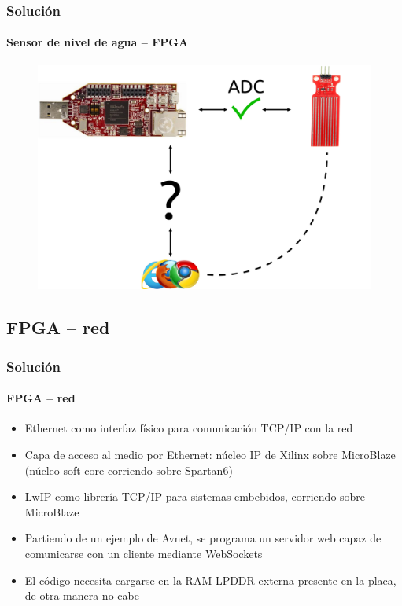 \documentclass[compress]{beamer}
\begin{document}
		\begin{frame}
			\frametitle{Soluci\'on}
			\framesubtitle{Sensor de nivel de agua -- FPGA}
				\begin{figure}
					\includegraphics[keepaspectratio = true, totalheight=0.6\textheight]{figuras/adc_ok.png}
				\end{figure}
 		\end{frame}

	\subsection{FPGA -- red}
		\begin{frame}
			\frametitle{Soluci\'on}
			\framesubtitle{FPGA -- red}
				\begin{itemize}
					\item
					{

						Ethernet como interfaz f\'isico para comunicaci\'on TCP/IP con la red

					}
					\item
					{

						Capa de acceso al medio por Ethernet: n\'ucleo IP de Xilinx sobre MicroBlaze (n\'ucleo soft-core corriendo sobre Spartan6)

					}
					\item
					{

						LwIP como librer\'ia TCP/IP para sistemas embebidos, corriendo sobre MicroBlaze

					}
					\item
					{

						Partiendo de un ejemplo de Avnet, se programa un servidor web capaz de comunicarse con un cliente mediante WebSockets

					}
					\item
					{

						El c\'odigo necesita cargarse en la RAM LPDDR externa presente en la placa, de otra manera no cabe

					}
				\end{itemize}

 		\end{frame}
\end{document}
